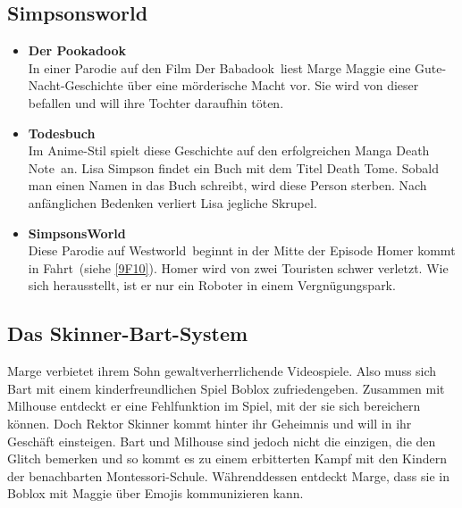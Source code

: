 \subsection{Simpsonsworld}
\begin{itemize}
	\item \textbf{Der Pookadook}\\ In einer Parodie auf den Film \glqq Der Babadook\grqq\ liest Marge Maggie eine Gute-Nacht-Geschichte über eine mörderische Macht vor. Sie wird von dieser befallen und will ihre Tochter daraufhin töten.
	\item \textbf{Todesbuch}\\ Im Anime-Stil spielt diese Geschichte auf den erfolgreichen Manga \glqq Death Note\grqq\ an. Lisa Simpson findet ein Buch mit dem Titel \glqq Death Tome\grqq . Sobald man einen Namen in das Buch schreibt, wird diese Person sterben. Nach anfänglichen Bedenken verliert Lisa jegliche Skrupel.
	\item \textbf{SimpsonsWorld}\\ Diese Parodie auf \grqq Westworld\grqq\ beginnt in der Mitte der Episode \glqq Homer kommt in Fahrt\grqq\ (siehe \ref{9F10}). Homer wird von zwei Touristen schwer verletzt. Wie sich herausstellt, ist er nur ein Roboter in einem Vergnügungspark.
\end{itemize}


\subsection{Das Skinner-Bart-System}
Marge verbietet ihrem Sohn gewaltverherrlichende Videospiele. Also muss sich Bart mit einem kinderfreundlichen Spiel Boblox zufriedengeben. Zusammen mit Milhouse entdeckt er eine Fehlfunktion im Spiel, mit der sie sich bereichern können. Doch Rektor Skinner kommt hinter ihr Geheimnis und will in ihr Geschäft einsteigen. Bart und Milhouse sind jedoch nicht die einzigen, die den Glitch bemerken und so kommt es zu einem erbitterten Kampf mit den Kindern der benachbarten Montessori-Schule. Währenddessen entdeckt Marge, dass sie in Boblox mit Maggie über Emojis kommunizieren kann.

